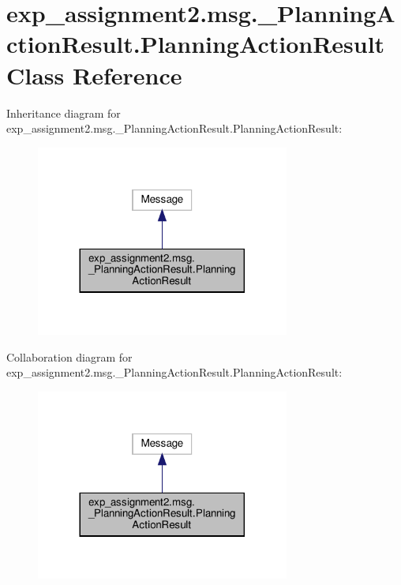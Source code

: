 \hypertarget{classexp__assignment2_1_1msg_1_1__PlanningActionResult_1_1PlanningActionResult}{}\section{exp\+\_\+assignment2.\+msg.\+\_\+\+Planning\+Action\+Result.\+Planning\+Action\+Result Class Reference}
\label{classexp__assignment2_1_1msg_1_1__PlanningActionResult_1_1PlanningActionResult}


Inheritance diagram for exp\+\_\+assignment2.\+msg.\+\_\+\+Planning\+Action\+Result.\+Planning\+Action\+Result\+:
\nopagebreak
\begin{figure}[H]
\begin{center}
\leavevmode
\includegraphics[width=236pt]{classexp__assignment2_1_1msg_1_1__PlanningActionResult_1_1PlanningActionResult__inherit__graph}
\end{center}
\end{figure}


Collaboration diagram for exp\+\_\+assignment2.\+msg.\+\_\+\+Planning\+Action\+Result.\+Planning\+Action\+Result\+:
\nopagebreak
\begin{figure}[H]
\begin{center}
\leavevmode
\includegraphics[width=236pt]{classexp__assignment2_1_1msg_1_1__PlanningActionResult_1_1PlanningActionResult__coll__graph}
\end{center}
\end{figure}
